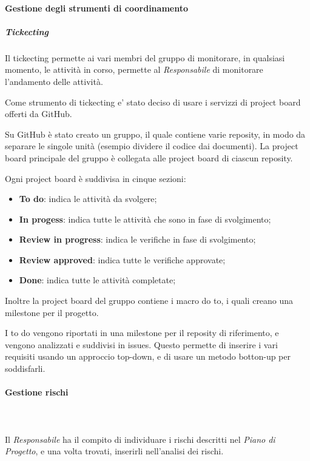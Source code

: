    			\paragraph{Gestione degli strumenti di coordinamento}
   				\subparagraph{Tickecting}
   					Il tickecting permette ai vari membri del gruppo di monitorare, in qualsiasi momento, le attività in corso, permette al \textit{Responsabile} di monitorare l'andamento delle attività.

   					Come strumento di tickecting e' stato deciso di usare i servizzi di project board offerti da GitHub.

   					Su GitHub è stato creato un gruppo, il quale contiene varie reposity, in modo da separare le singole unità (esempio dividere il codice dai documenti).
   					La project board principale del gruppo è collegata  alle project board di ciascun reposity.

   					Ogni project board è suddivisa in cinque sezioni:
   					\begin{itemize}
   						\item \textbf{To do}: indica le attività da svolgere;
   						\item \textbf{In progess}: indica tutte le attività che sono in fase di svolgimento;
   						\item \textbf{Review in progress}: indica le verifiche in fase di svolgimento;
   						\item \textbf{Review approved}: indica tutte le verifiche approvate;
   						\item \textbf{Done}: indica tutte le attività completate;
   					\end{itemize}
   					Inoltre la project board del gruppo contiene i macro do to, i quali creano una milestone per il progetto.

   					I to do vengono riportati in una milestone per il reposity di riferimento, e vengono analizzati e suddivisi in issues. Questo permette di inserire i vari requisiti usando un approccio top-down, e di usare un metodo botton-up per soddisfarli.
   			\paragraph{Gestione rischi}\mbox{}\\ \mbox{}\\
   				Il \textit{Responsabile} ha il compito di individuare i rischi descritti nel \textit{Piano di Progetto\docs}, e una volta trovati, inserirli nell'analisi dei rischi.

